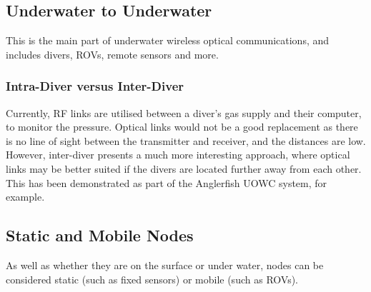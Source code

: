 \subsection{Underwater to Underwater}
This is the main part of underwater wireless optical communications, and
includes divers, \ac{ROV}s, remote sensors and more.

\subsubsection{Intra-Diver versus Inter-Diver}
Currently, \ac{RF} links are utilised between a diver's gas supply and
their computer, to monitor the pressure. Optical links would not be
a good replacement as there is no line of sight between the transmitter
and receiver, and the distances are low. However, inter-diver presents
a much more interesting approach, where optical links may be better suited
if the divers are located further away from each other. This has been
demonstrated as part of the Anglerfish \ac{UOWC} system, for example.

\subsection{Static and Mobile Nodes}
As well as whether they are on the surface or under water, nodes can be
considered static (such as fixed sensors) or mobile (such as \ac{ROV}s).